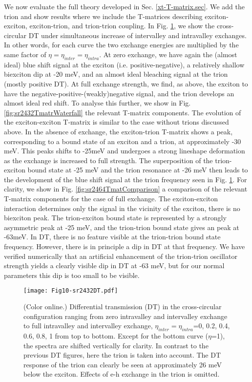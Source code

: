 \documentclass[aps,prb,superscriptaddress,letterpaper,amsmath,amssymb,twocolumn,preprintnumbers]{revtex4}
\begin{document}
We now evaluate the full theory developed in Sec. \ref{xt-T-matrix.sec}. We add the trion and show results where we include the T-matrices describing exciton-exciton, exciton-trion, and trion-trion coupling. In Fig. \ref{fig:sr2432DT}, we
%
show the cross-circular DT under simultaneous increase of intervalley and intravalley exchanges. In other words, for each curve the two exchange energies are multiplied by the same factor of $\eta = \eta_{inter} = \eta_{intra}$. At zero exchange, we have again the (almost ideal) blue shift signal at the exciton (i.e. positive-negative), a relatively shallow biexciton dip at -20 meV, and an almost ideal bleaching signal at the trion (mostly positive DT). At full exchange strength, we find, as above, the exciton to have the negative-positive-(weakly)negative signal, and the trion develops an almost ideal red shift.
To analyse this further, we show in Fig. \ref{fig:sr2432TmatrWaterfall} the relevant T-matrix components. The evolution of the exciton-exciton T-matrix is similar to the case without trions discussed above. In the absence of exchange, the exciton-trion T-matrix shows a peak, corresponding to a bound state of an exciton and a trion, at approximately -30 meV.
This peaks shifts to -25meV and undergoes a strong lineshape deformation as the exchange is increased to full strength. The superposition of the trion-exciton bound state at -25 meV and the trion resonance at -26 meV  then leads to the  development of the blue shift signal at the trion frequency seen in Fig. \ref{fig:sr2432DT}.
For clarity, we show in Fig. \ref{fig:sr2464TmatComparison}  a comparison of the relevant T-matrix components  for the case of full exchange. The exciton-exciton interaction determines only the signal in the vicinity of the exciton, there is no biexciton peak. The trion-exciton bound state is represented by a strongly asymmetric peak at -25 meV, and the trion-trion bound state gives an peak at -63meV. In DT, there is no feature visible at the trion-trion bound state frequency. However, there is in principle a dip in DT at that frequency. We have verified numerically that an artificial enhancement of the trion-trion oscillator strength yields a clearly visible dip in DT at -63 meV, but for our normal parameters this dip is too small to be visible.




\begin{figure}
	\centering
	\texttt{[image: Fig10-sr2432DT.pdf]}
	\caption{
		(Color online.)
		Differential transmission (DT) in the cross-circular configuration ranging from zero intravalley and intervalley exchange  to full
intravalley and intervalley exchange,   $\eta_{inter} = \eta_{intra}$=0, 0.2, 0.4, 0.6, 0.8, 1 from top to bottom. Except for the bottom curve ($\eta$=1), the spectra are shifted vertically
for clarity. In contrast to the previous DT figures, here the trion is taken into account. The DT response of the trion can clearly be seen at approximately 26 meV below the exciton. Effects of e-h exchange in the trion is omitted.
}	
	\label{fig:sr2432DT}
\end{figure}
\end{document}
